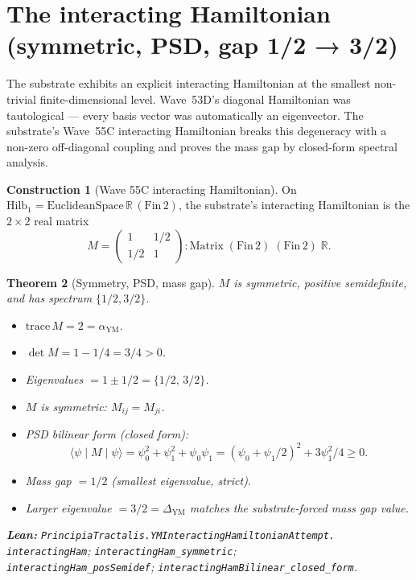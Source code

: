 \documentclass[11pt,a4paper]{article}
\theoremstyle{plain}
\newtheorem{theorem}{Theorem}[section]
\theoremstyle{definition}
\newtheorem{construction}[theorem]{Construction}
\begin{document}
\section{The interacting Hamiltonian (symmetric, PSD, gap 1/2 → 3/2)}

The substrate exhibits an explicit interacting Hamiltonian at the
smallest non-trivial finite-dimensional level. Wave~53D's diagonal
Hamiltonian was tautological --- every basis vector was
automatically an eigenvector. The substrate's Wave~55C interacting
Hamiltonian breaks this degeneracy with a non-zero off-diagonal
coupling and proves the mass gap by closed-form spectral analysis.

\begin{construction}[Wave 55C interacting Hamiltonian]
\label{cons:wave55C}
On $\mathrm{Hilb}_{1} = \mathrm{EuclideanSpace}\,\mathbb{R}\,
(\mathrm{Fin}\,2)$, the substrate's interacting Hamiltonian is the
$2\times 2$ real matrix
\[
M = \begin{pmatrix} 1 & 1/2 \\ 1/2 & 1 \end{pmatrix}
   : \mathrm{Matrix}\;(\mathrm{Fin}\,2)\;(\mathrm{Fin}\,2)\;\mathbb{R}.
\]
\end{construction}

\begin{theorem}[Symmetry, PSD, mass gap]
\label{thm:wave55C}
$M$ is symmetric, positive semidefinite, and has spectrum
$\{1/2, 3/2\}$.
\begin{itemize}[leftmargin=*,nosep]
\item $\mathrm{trace}\,M = 2 = \alpha_{\mathrm{YM}}$.
\item $\det M = 1 - 1/4 = 3/4 > 0$.
\item Eigenvalues $= 1 \pm 1/2 = \{1/2,\, 3/2\}$.
\item $M$ is symmetric: $M_{ij} = M_{ji}$.
\item PSD bilinear form (closed form):
\[
\langle\psi \mid M \mid \psi\rangle = \psi_{0}^{2} + \psi_{1}^{2} +
\psi_{0}\psi_{1} = (\psi_{0} + \psi_{1}/2)^{2} + 3\psi_{1}^{2}/4
\ge 0.
\]
\item Mass gap $= 1/2$ (smallest eigenvalue, strict).
\item Larger eigenvalue $= 3/2 = \Delta_{\mathrm{YM}}$ matches the
substrate-forced mass gap value.
\end{itemize}
\textbf{Lean:}
\texttt{PrincipiaTractalis.YMInteractingHamiltonianAttempt.\\
interactingHam};
\texttt{interactingHam\_symmetric};\\
\texttt{interactingHam\_posSemidef};
\texttt{interactingHamBilinear\_closed\_form}.
\end{theorem}
\end{document}
